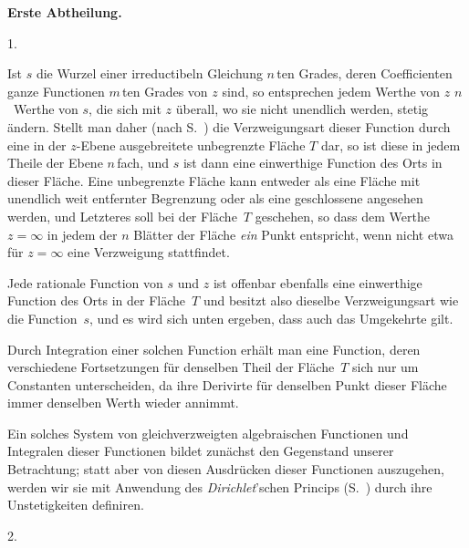 \documentclass[a4paper,12pt,leqno]{article}
\begin{document}
\begin{center}
\large\bfseries
Erste Abtheilung.
\end{center}
 
\centerline{1.}

\nobreak\medskip

Ist $s$ die Wurzel einer irreductibeln Gleichung $n \,$\-ten Grades,
deren Coefficienten ganze Functionen $m \,$\-ten Grades von $z$
sind, so entsprechen jedem Werthe von $z$ $n$~Werthe von $s$, die
sich mit $z$ \"{u}berall, wo sie nicht unendlich werden, stetig
\"{a}ndern.  Stellt man daher (nach S.~\pageref{`Flaeche'}) die
Verzweigungsart dieser Function durch eine in der $z$-Ebene
ausgebreitete unbegrenzte Fl\"{a}che $T$ dar, so ist diese in
jedem Theile der Ebene $n \,$\-fach, und $s$ ist dann eine
einwerthige Function des Orts in dieser Fl\"{a}che.  Eine
unbegrenzte Fl\"{a}che kann entweder als eine Fl\"{a}che mit
unendlich weit entfernter Begrenzung oder als eine geschlossene
angesehen werden, und Letzteres soll bei der Fl\"{a}che~$T$
geschehen, so dass dem Werthe $z = \infty$ in jedem der $n$
Bl\"{a}tter der Fl\"{a}che \emph{ein} Punkt entspricht, wenn
nicht etwa f\"{u}r $z = \infty$ eine Verzweigung stattfindet.

Jede rationale Function von $s$ und $z$ ist offenbar ebenfalls
eine einwerthige Function des Orts in der Fl\"{a}che~$T$ und
besitzt also dieselbe Verzweigungsart wie die Function~$s$, und
es wird sich unten ergeben, dass auch das Umgekehrte gilt.

Durch Integration einer solchen Function erh\"{a}lt man eine
Function, deren verschiedene Fortsetzungen f\"{u}r denselben
Theil der Fl\"{a}che~$T$ sich nur um Constanten unterscheiden, da
ihre Derivirte f\"{u}r denselben Punkt dieser Fl\"{a}che immer
denselben Werth wieder annimmt.

Ein solches System von gleichverzweigten algebraischen Functionen
und Integralen dieser Functionen bildet zun\"{a}chst den
Gegenstand unserer Betrachtung; statt aber von diesen
Ausdr\"{u}cken dieser Functionen auszugehen, werden wir sie mit
Anwendung des \emph{Dirichlet}'schen Princips
(S.~\pageref{`Bestimmung'}) durch ihre Unstetigkeiten definiren.

\medbreak

\centerline{2.}

\nobreak\medskip
\end{document}
